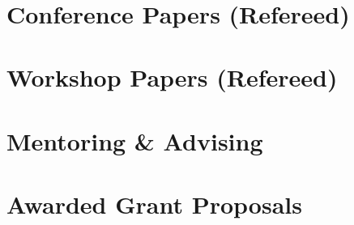 \documentclass[line]{res}
\begin{document}
\begin{resume}

\vspace{-0.4cm} 


%


\section{\large Conference Papers (Refereed)}
\vspace{0.1cm}

\vspace{-0.4cm}

\section{\large Workshop Papers (Refereed)} \vspace{0.3cm}

\vspace{-0.4cm}

\section{\large Mentoring \& Advising}



\section{\large Awarded Grant Proposals} \vspace{0.45cm}


\end{resume}
\end{document}
